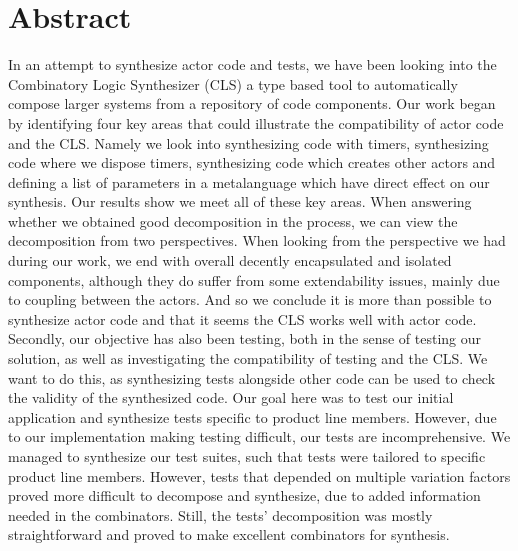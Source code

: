 \section{Abstract}
In an attempt to synthesize actor code and tests, we have been looking into the Combinatory Logic Synthesizer (CLS) a type based tool to automatically compose larger systems from a repository of code components. Our work began by identifying four key areas that could illustrate the compatibility of actor code and the CLS. Namely we look into synthesizing code with timers, synthesizing code where we dispose timers, synthesizing code which creates other actors and defining a list of parameters in a metalanguage which have direct effect on our synthesis. Our results show we meet all of these key areas. When answering whether we obtained good decomposition in the process, we can view the decomposition from two perspectives. When looking from the perspective we had during our work, we end with overall decently encapsulated and isolated components, although they do suffer from some extendability issues, mainly due to coupling between the actors. And so we conclude it is more than possible to synthesize actor code and that it seems the CLS works well with actor code.\\
Secondly, our objective has also been testing, both in the sense of testing our solution, as well as investigating the compatibility of testing and the CLS. We want to do this, as synthesizing tests alongside other code can be used to check the validity of the synthesized code. Our goal here was to test our initial application and synthesize tests specific to product line members. However, due to our implementation making testing difficult, our tests are incomprehensive. We managed to synthesize our test suites, such that tests were tailored to specific product line members. However, tests that depended on multiple variation factors proved more difficult to decompose and synthesize, due to added information needed in the combinators. Still, the tests' decomposition was mostly straightforward and proved to make excellent combinators for synthesis.

